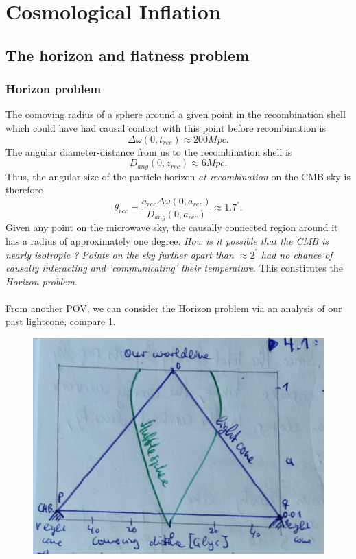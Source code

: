 \newpage
\section{Cosmological Inflation}
\subsection{The horizon and flatness problem}
\subsubsection{Horizon problem}
The comoving radius of a sphere around a given point in the recombination shell which could have had causal contact with this point before recombination is
\begin{equation}
	\Delta \omega(0,t_{rec}) \approx 200 Mpc.
\end{equation}
The angular diameter-distance from us to the recombination shell is 
\begin{equation}
	D_{ang}(0,z_{rec}) \approx 6 Mpc.
\end{equation}
Thus, the angular size of the particle horizon \emph{at recombination} on the CMB sky is therefore
\begin{equation}
	\theta_{rec} = \frac{a_{rec} \Delta \omega(0,a_{rec})}{D_{ang}(0,a_{rec})} \approx 1.7^°.
\end{equation}
Given any point on the microwave sky, the causally connected region around it has a radius of approximately one degree.
\emph{How is it possible that the CMB is nearly isotropic ? Points on the sky further apart than $\approx 2^°$ had no chance of causally interacting and ’communicating’ their temperature}. This constitutes the \emph{Horizon problem}.\\
\\
From another POV, we can consider the Horizon problem via an analysis of our past lightcone, compare \ref{fig:horizonproblem}.
\begin{figure}[h!]
	\centering
	\includegraphics[width=0.7\linewidth]{gfx/horizonproblem}
	\caption{}
	\label{fig:horizonproblem}
\end{figure}
